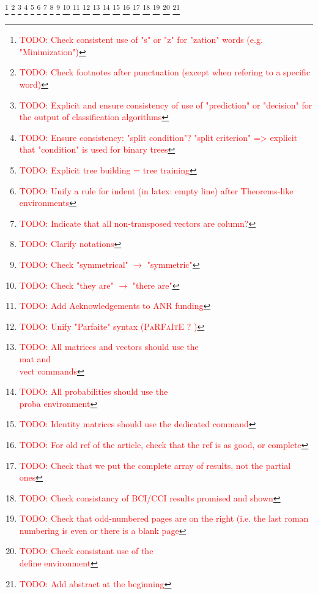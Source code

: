 \documentclass[a4paper, 12pt, openright]{book}
\newcommand{\todo}[1]{%
\textcolor{red}{\footnote{\textcolor{red}{TODO: #1}}}}
\newcommand{\define}[1]{\textbf{#1}}
\newcommand{\vect}[1]{\boldsymbol{#1}}
\newcommand{\mat}[1]{\boldsymbol{#1}}
\newcommand{\proba}[1]{\mathbb{P}\left(#1\right)}
\begin{document}
\diplayFirstPage




\printbibliography

\todo{Check consistent use of "s" or "z" for "zation" words (e.g. "Minimization")}
\todo{Check footnotes after punctuation (except when refering to a specific word)}
\todo{Explicit and ensure consistency of use of "prediction" or "decision" for the output of classification algorithms}
\todo{Ensure consistency: "split condition"? "split criterion" => explicit that "condition" is used for binary trees}
\todo{Explicit tree building = tree training}
\todo{Unify a rule for indent (in latex: empty line) after Theorems-like environments}
\todo{Indicate that all non-transposed vectors are column?}
\todo{Clarify notations}
\todo{Check "symmetrical" $\rightarrow$ "symmetric"}
\todo{Check "they are" $\rightarrow$ "there are"}
\todo{Add Acknowledgements to ANR funding}
\todo{Unify "Parfaite" syntax (\textsc{PaRFaItE} ? )}
\todo{All matrices and vectors should use the \\mat and \\vect commands}
\todo{All probabilities should use the \\proba environment}
\todo{Identity matrices should use the dedicated command}
\todo{For old ref of the article, check that the ref is as good, or complete}
\todo{Check that we put the complete array of results, not the partial ones}
\todo{Check consistancy of BCI/CCI results promised and shown}
\todo{Check that odd-numbered pages are on the right (i.e. the last roman numbering is even or there is a blank page}
\todo{Check consistant use of the \\define environment}
\todo{Add abstract at the beginning}
\diplayLastPage
\end{document}
